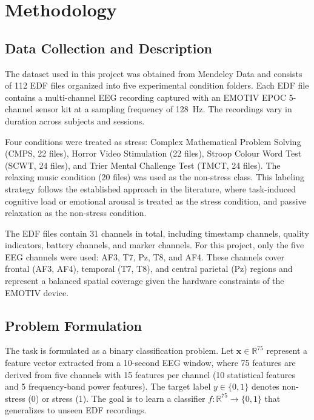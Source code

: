 \documentclass[12pt,a4paper]{article}
\begin{document}
	\section{Methodology}

	\subsection{Data Collection and Description}

	The dataset used in this project was obtained from Mendeley Data \cite{dataset} and consists of 112 EDF files organized into five experimental condition folders. Each EDF file contains a multi-channel EEG recording captured with an EMOTIV EPOC 5-channel sensor kit at a sampling frequency of 128~Hz. The recordings vary in duration across subjects and sessions.

	Four conditions were treated as stress: Complex Mathematical Problem Solving (CMPS, 22 files), Horror Video Stimulation (22 files), Stroop Colour Word Test (SCWT, 24 files), and Trier Mental Challenge Test (TMCT, 24 files). The relaxing music condition (20 files) was used as the non-stress class. This labeling strategy follows the established approach in the literature, where task-induced cognitive load or emotional arousal is treated as the stress condition, and passive relaxation as the non-stress condition.

	The EDF files contain 31 channels in total, including timestamp channels, quality indicators, battery channels, and marker channels. For this project, only the five EEG channels were used: AF3, T7, Pz, T8, and AF4. These channels cover frontal (AF3, AF4), temporal (T7, T8), and central parietal (Pz) regions and represent a balanced spatial coverage given the hardware constraints of the EMOTIV device.

	\subsection{Problem Formulation}

	The task is formulated as a binary classification problem. Let $\mathbf{x} \in \mathbb{R}^{75}$ represent a feature vector extracted from a 10-second EEG window, where 75 features are derived from five channels with 15 features per channel (10 statistical features and 5 frequency-band power features). The target label $y \in \{0, 1\}$ denotes non-stress (0) or stress (1). The goal is to learn a classifier $f: \mathbb{R}^{75} \rightarrow \{0, 1\}$ that generalizes to unseen EDF recordings.
\end{document}
